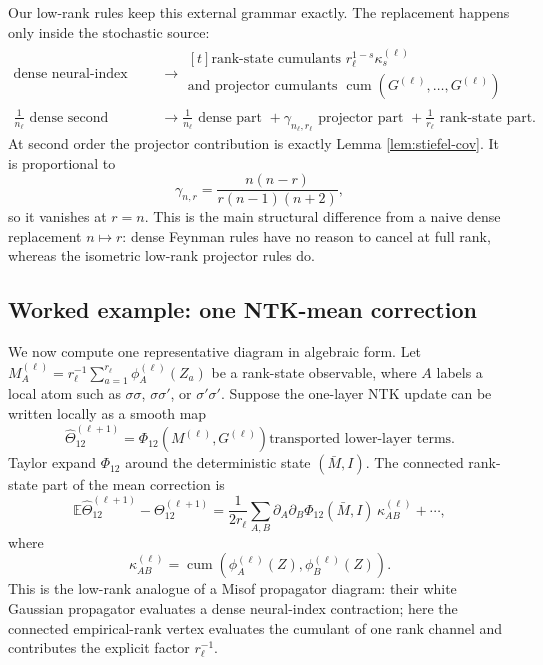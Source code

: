 \documentclass{article}
\newcommand{\E}{\mathbb E}
\newcommand{\cumul}{\operatorname{cum}}
\begin{document}
Our low-rank rules keep this external grammar exactly. The replacement happens only inside the stochastic source:
\[
\scriptstyle
\begin{aligned}
\text{dense neural-index source}
&\longrightarrow
\begin{gathered}[t]
\text{rank-state cumulants } r_\ell^{1-s}\kappa_s^{(\ell)}\\
\text{and projector cumulants }\cumul(G^{(\ell)},\ldots,G^{(\ell)})
\end{gathered}
\\[0.4em]
\frac1{n_\ell}\text{ dense second cumulant}
&\longrightarrow
\frac1{n_\ell}\text{ dense part }
+\gamma_{n_\ell,r_\ell}\text{ projector part }
+\frac1{r_\ell}\text{ rank-state part}.
\end{aligned}
\]
At second order the projector contribution is exactly Lemma \ref{lem:stiefel-cov}. It is proportional to
\[
\gamma_{n,r}=\frac{n(n-r)}{r(n-1)(n+2)},
\]
so it vanishes at \(r=n\). This is the main structural difference from a naive dense replacement \(n\mapsto r\): dense Feynman rules have no reason to cancel at full rank, whereas the isometric low-rank projector rules do.

\subsection{Worked example: one NTK-mean correction}
\label{app:worked-lowrank-diagram}
We now compute one representative diagram in algebraic form. Let \(M_A^{(\ell)}=r_\ell^{-1}\sum_{a=1}^{r_\ell}\phi_A^{(\ell)}(Z_a)\) be a rank-state observable, where \(A\) labels a local atom such as \(\sigma\sigma\), \(\sigma\sigma'\), or \(\sigma'\sigma'\). Suppose the one-layer NTK update can be written locally as a smooth map
\[
\widehat\Theta_{12}^{(\ell+1)}
=\Phi_{12}\!\left(M^{(\ell)},G^{(\ell)}\right)
\text{transported lower-layer terms}.
\]
Taylor expand \(\Phi_{12}\) around the deterministic state \((\bar M,I)\). The connected rank-state part of the mean correction is
\begin{equation}
\E\widehat\Theta_{12}^{(\ell+1)}-\Theta_{12}^{(\ell+1)}
=
\frac{1}{2r_\ell}
\sum_{A,B}
\partial_A\partial_B\Phi_{12}(\bar M,I)\,
\kappa_{AB}^{(\ell)}
+\cdots,
\label{eq:worked-rank-mean}
\end{equation}
where
\[
\kappa_{AB}^{(\ell)}
=\cumul\left(\phi_A^{(\ell)}(Z),\phi_B^{(\ell)}(Z)\right).
\]
This is the low-rank analogue of a Misof propagator diagram: their white Gaussian propagator evaluates a dense neural-index contraction; here the connected empirical-rank vertex evaluates the cumulant of one rank channel and contributes the explicit factor \(r_\ell^{-1}\).
\end{document}
